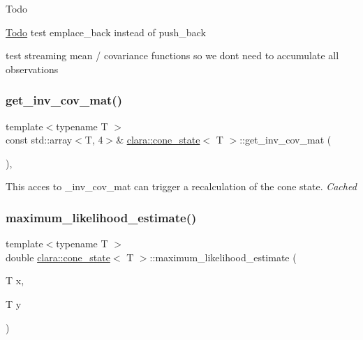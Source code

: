 \begin{DoxyRefDesc}{Todo}
\item[\hyperlink{todo__todo000002}{Todo}]test emplace\+\_\+back instead of push\+\_\+back 

test streaming mean / covariance functions so we don\textquotesingle{}t need to accumulate all observations \end{DoxyRefDesc}
\mbox{\label{classclara_1_1cone__state_a7a0584b86ba125a2c232f26d4d1e4a38}} 
\subsubsection{\texorpdfstring{get\+\_\+inv\+\_\+cov\+\_\+mat()}{get\_inv\_cov\_mat()}}
{\footnotesize\ttfamily template$<$typename T $>$ \\
const std\+::array$<$T, 4$>$\& \hyperlink{classclara_1_1cone__state}{clara\+::cone\+\_\+state}$<$ T $>$\+::get\+\_\+inv\+\_\+cov\+\_\+mat (\begin{DoxyParamCaption}{ }\end{DoxyParamCaption})\hspace{0.3cm}{\ttfamily [inline]}, {\ttfamily [private]}}



This acces to {\ttfamily \+\_\+inv\+\_\+cov\+\_\+mat} can trigger a recalculation of the cone state. {\itshape Cached} 

\mbox{\label{classclara_1_1cone__state_a331360538f2fc8ccaaa37db2a71cc1a8}} 
\subsubsection{\texorpdfstring{maximum\+\_\+likelihood\+\_\+estimate()}{maximum\_likelihood\_estimate()}}
{\footnotesize\ttfamily template$<$typename T $>$ \\
double \hyperlink{classclara_1_1cone__state}{clara\+::cone\+\_\+state}$<$ T $>$\+::maximum\+\_\+likelihood\+\_\+estimate (\begin{DoxyParamCaption}\item[{T}]{x,  }\item[{T}]{y }\end{DoxyParamCaption})\hspace{0.3cm}{\ttfamily [inline]}}




